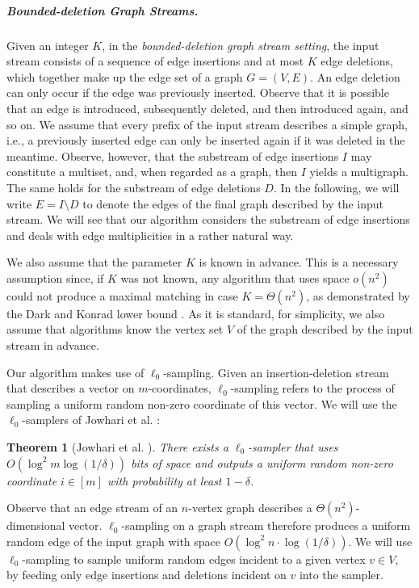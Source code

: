 \documentclass[11pt,a4paper]{article}
\newtheorem{theorem}{Theorem}
\begin{document}
\subparagraph{Bounded-deletion Graph Streams.} Given an integer $K$, in the {\em bounded-deletion graph stream setting}, the input stream consists of a sequence of edge insertions and at most $K$ edge deletions, which together make up the edge set of a graph $G=(V, E)$. An edge deletion can only occur if the edge was previously inserted. Observe that it is possible that an edge is introduced, subsequently deleted, and then introduced again, and so on. We assume that every prefix of the input stream describes a simple graph, i.e., a previously inserted edge can only be inserted again if it was deleted in the meantime.  Observe, however, that the substream of edge insertions $I$ may constitute a multiset, and, when regarded as a graph, then $I$ yields a multigraph. The same holds for the substream of edge deletions $D$. In the following, we will write $E= I \setminus D$ to denote the edges of the final graph described by the input stream.  We will see that our algorithm considers the substream of edge insertions and deals with edge multiplicities in a rather natural way. 

We also assume that the parameter $K$ is known in advance. This is a necessary assumption since, if $K$ was not known, any algorithm that uses space $o(n^2)$ could not produce a maximal matching in case $K= \Theta(n^2)$, as demonstrated by the Dark and Konrad lower bound \cite{dk20}. As it is standard, for simplicity, we also assume that algorithms know the vertex set $V$ of the graph described by the input stream in advance.

Our algorithm makes use of $\ell_0$-sampling. Given an insertion-deletion stream that describes a vector on $m$-coordinates, $\ell_0$-sampling refers to the process of sampling a uniform random non-zero coordinate of this vector. We will use the $\ell_0$-samplers of Jowhari et al. \cite{jst11}:
\begin{theorem}[Jowhari et al. \cite{jst11}]
    There exists a $\ell_0$-sampler that uses $O(\log^2 m \log(1/\delta))$ bits of space and outputs a uniform random non-zero coordinate $i \in [m]$ with probability at least $1 - \delta$.
\end{theorem}
Observe that an edge stream of an $n$-vertex graph  describes a $\Theta(n^2)$-dimensional vector. $\ell_0$-sampling on a graph stream therefore produces a uniform random edge of the input graph with space $O(\log^2 n \cdot \log(1/\delta))$. We will use $\ell_0$-sampling to sample uniform random edges incident to a given vertex $v \in V$, by feeding only edge insertions and deletions incident on $v$ into the sampler.
\end{document}
